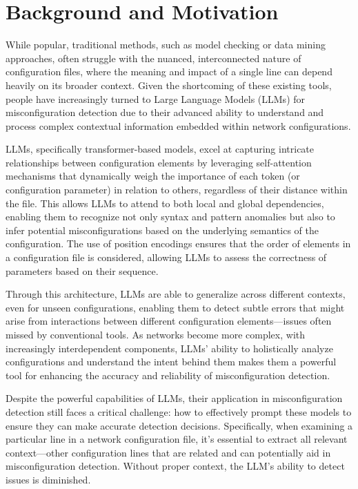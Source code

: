 \section{Background and Motivation}
\label{sec_background}

While popular, traditional methods, such as model checking or data mining approaches, often struggle with the nuanced, interconnected nature of configuration files, where the meaning and impact of a single line can depend heavily on its broader context.
Given the shortcoming of these existing tools,
people have increasingly turned to Large Language Models (LLMs) for misconfiguration detection due to their advanced ability to understand and process complex contextual information embedded within network configurations.

LLMs, specifically transformer-based models, excel at capturing intricate relationships between configuration elements by leveraging self-attention mechanisms that dynamically weigh the importance of each token (or configuration parameter) in relation to others, regardless of their distance within the file. This allows LLMs to attend to both local and global dependencies, enabling them to recognize not only syntax and pattern anomalies but also to infer potential misconfigurations based on the underlying semantics of the configuration. The use of position encodings ensures that the order of elements in a configuration file is considered, allowing LLMs to assess the correctness of parameters based on their sequence.

Through this architecture, LLMs are able to generalize across different contexts, even for unseen configurations, enabling them to detect subtle errors that might arise from interactions between different configuration elements—issues often missed by conventional tools. As networks become more complex, with increasingly interdependent components, LLMs' ability to holistically analyze configurations and understand the intent behind them makes them a powerful tool for enhancing the accuracy and reliability of misconfiguration detection.


Despite the powerful capabilities of LLMs, their application in misconfiguration detection still faces a critical challenge: how to effectively prompt these models to ensure they can make accurate detection decisions. Specifically, when examining a particular line in a network configuration file, it’s essential to extract all relevant context—other configuration lines that are related and can potentially aid in misconfiguration detection. Without proper context, the LLM’s ability to detect issues is diminished.

